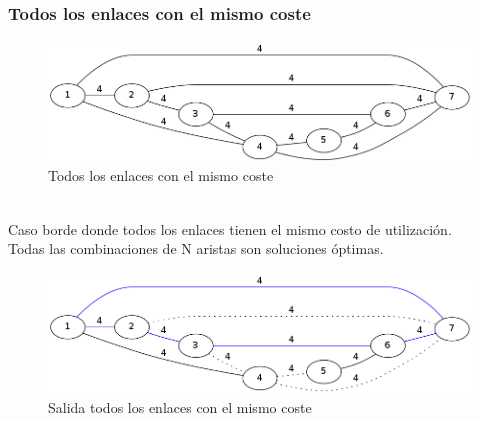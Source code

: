 \newpage
\subsubsection{Todos los enlaces con el mismo coste}
\begin{figure}[h]
  \centering
    \includegraphics[scale=0.45]{ej3/caso3-1.png}
  \caption{Todos los enlaces con el mismo coste}
  \label{fig:ejemplo}
\end{figure}
~
\\
Caso borde donde todos los enlaces tienen el mismo costo de utilizaci\'on.\\
Todas las combinaciones de N aristas son soluciones \'optimas.
\begin{figure}[h]
  \centering
    \includegraphics[scale=0.45]{ej3/caso3-2.png}
  \caption{Salida todos los enlaces con el mismo coste}
  \label{fig:ejemplo}
\end{figure}
\\
~
\newpage

